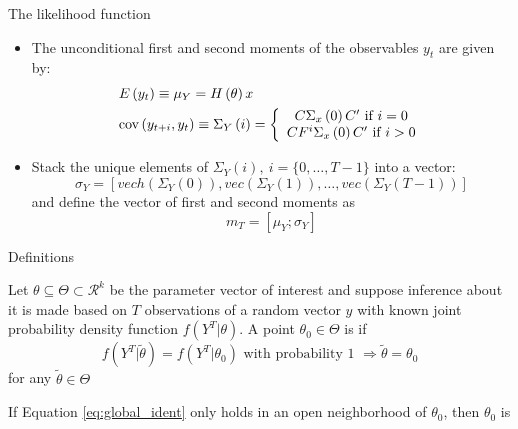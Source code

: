 \documentclass[handout,usepdftitle=false,xcolor=dvipsnames,aspectratio=169]{beamer}
\begin{document}
\begin{frame}{The likelihood function}
  \begin{itemize}
    \item The unconditional first and second moments of the observables $y_t$ are given by:
          \[\begin{gathered}
              E\left(y_t\right) \equiv {\mu _Y} = H\left( \theta  \right)x \hfill \\
              \operatorname{cov} \left( {{y_{t + i}},{y_t}} \right) \equiv {\Sigma _Y}\left( i \right) = \left\{ {\begin{array}{*{20}{c}}
                    {C{\Sigma _x}\left( 0 \right)C' \text{ if } i = 0} \\
                    {C{F^i}{\Sigma _x}\left( 0 \right)C' \text{ if } i > 0}
                  \end{array}} \right. \hfill \\
            \end{gathered} \]
    \item Stack the unique elements of ${\Sigma _Y}\left( i \right), \: i =\{0,\ldots,T-1\}$ into a vector:
          \begin{equation}
            {\sigma _Y} = \left[ {vech\left( {{\Sigma _Y}\left( 0 \right)} \right),vec\left( {{\Sigma _Y}\left( 1 \right)} \right), \ldots ,vec\left( {{\Sigma _Y}\left( {T - 1} \right)} \right)} \right]
          \end{equation}
          and define the vector of first and second moments as
          \begin{equation}
            {m_T} = [{\mu _Y};{\sigma _Y}] \label{eq:moment_vector}
          \end{equation}
  \end{itemize}
\end{frame}

\begin{frame}{Definitions}
  \begin{definition}
    Let $\theta\subseteq \Theta \subset \mathcal{R}^k$ be the parameter vector of interest and suppose inference about it is made based on $T$ observations of a random vector $y$ with known joint probability density function $f(Y^T|\theta)$. A point $\theta_0 \in \Theta$ is  if
    \begin{equation}
      f\left( {{Y^T}|\tilde \theta } \right) = f\left( {{Y^T}|{\theta _0}} \right) \text{ with probability 1 } \Rightarrow \tilde \theta  = {\theta _0} \label{eq:global_ident}
    \end{equation}
    for any $\tilde \theta \in \Theta$
  \end{definition}
  \begin{definition}
    If Equation \eqref{eq:global_ident} only holds in an open neighborhood of $\theta_0$, then $\theta_0$ is 
  \end{definition}
\end{frame}
\end{document}
